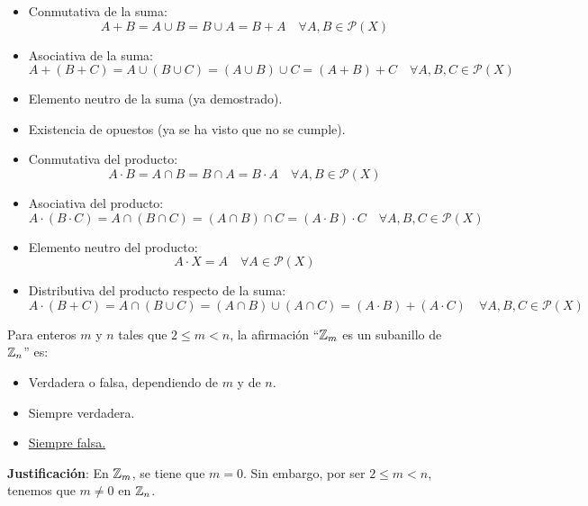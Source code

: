 \begin{ejercicio}
    \begin{itemize}
        \item Conmutativa de la suma:
        \begin{equation*}
            A + B = A \cup B = B \cup A = B + A\quad\forall A,B \in \mathcal{P}(X)
        \end{equation*}
        \item Asociativa de la suma:
        \begin{equation*}
            A + (B + C) = A \cup (B \cup C) = (A \cup B) \cup C = (A+B)+C\quad\forall A,B,C \in \mathcal{P}(X)
        \end{equation*}
        \item Elemento neutro de la suma (ya demostrado).
        \item Existencia de opuestos (ya se ha visto que no se cumple).
        \item Conmutativa del producto:
        \begin{equation*}
            A \cdot B = A \cap B = B \cap A = B \cdot A\quad\forall A,B \in \mathcal{P}(X)
        \end{equation*}
        \item Asociativa del producto:
        \begin{equation*}
            A \cdot (B \cdot C) = A \cap (B \cap C) = (A \cap B) \cap C = (A\cdot B)\cdot C\quad\forall A,B,C \in \mathcal{P}(X)
        \end{equation*}
        \item Elemento neutro del producto:
            \begin{equation*}
                A \cdot X = A\quad\forall A \in \mathcal{P}(X)
            \end{equation*}
        \item Distributiva del producto respecto de la suma:
            \begin{equation*}
                A \cdot (B + C) = A \cap (B \cup C) = (A \cap B) \cup (A \cap C) = (A \cdot B) +(A\cdot C)\quad\forall A,B,C \in \mathcal{P}(X)
            \end{equation*}
    \end{itemize}
\end{ejercicio}

\begin{ejercicio}
    Para enteros $m$ y $n$ tales que $2 \leq m < n$, la afirmación ``$\mathbb{Z}_m$ es un subanillo de $\mathbb{Z}_n$'' es:
    \begin{itemize}
        \item Verdadera o falsa, dependiendo de $m$ y de $n$.
        \item Siempre verdadera.
        \item \underline{Siempre falsa.}
    \end{itemize}

    \noindent
    \textbf{Justificación}:
    En $\mathbb{Z}_m$, se tiene que $m = 0$.\newline
    Sin embargo, por ser $2 \leq m < n$, tenemos que $m \neq 0$ en $\mathbb{Z}_n$.
\end{ejercicio}

